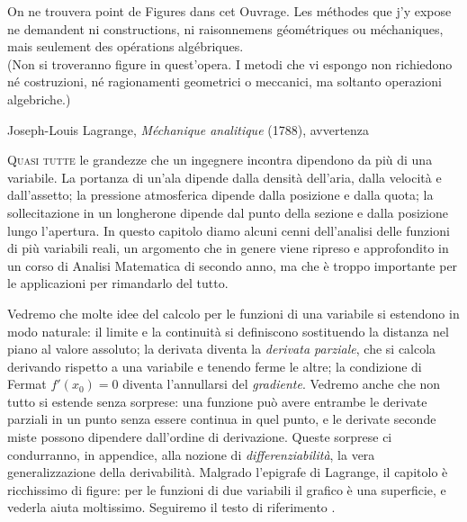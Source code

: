 
\epigraph{On ne trouvera point de Figures dans cet Ouvrage. Les méthodes que j'y
expose ne demandent ni constructions, ni raisonnemens géométriques ou méchaniques, mais
seulement des opérations algébriques.\\[2pt]
\upshape(Non si troveranno figure in quest'opera. I metodi che vi espongo non
richiedono né costruzioni, né ragionamenti geometrici o meccanici, ma soltanto
operazioni algebriche.)}{Joseph-Louis Lagrange, \emph{Méchanique analitique} (1788),
avvertenza}

\lettrine[lines=3, findent=2pt, nindent=0pt]{Q}{uasi tutte} le grandezze che un
ingegnere incontra dipendono da più di una variabile. La portanza di un'ala dipende
dalla densità dell'aria, dalla velocità e dall'assetto; la pressione atmosferica dipende
dalla posizione e dalla quota; la sollecitazione in un longherone dipende dal punto
della sezione e dalla posizione lungo l'apertura. In questo capitolo diamo alcuni cenni
dell'analisi delle funzioni di più variabili reali, un argomento che in genere viene
ripreso e approfondito in un corso di Analisi Matematica di secondo anno, ma che è
troppo importante per le applicazioni per rimandarlo del tutto.

Vedremo che molte idee del calcolo per le funzioni di una variabile si estendono in modo
naturale: il limite e la continuità si definiscono sostituendo la distanza nel piano al
valore assoluto; la derivata diventa la \emph{derivata parziale}, che si calcola
derivando rispetto a una variabile e tenendo ferme le altre; la condizione di Fermat
$f'(x_{0})=0$ diventa l'annullarsi del \emph{gradiente}. Vedremo anche che non tutto si
estende senza sorprese: una funzione può avere entrambe le derivate parziali in un punto
senza essere continua in quel punto, e le derivate seconde miste possono dipendere
dall'ordine di derivazione. Queste sorprese ci condurranno, in appendice, alla nozione
di \emph{differenziabilità}, la vera generalizzazione della derivabilità. Malgrado
l'epigrafe di Lagrange, il capitolo è ricchissimo di figure: per le funzioni di due
variabili il grafico è una superficie, e vederla aiuta moltissimo. Seguiremo il testo di
riferimento \cite{marcellini-sbordone}.

